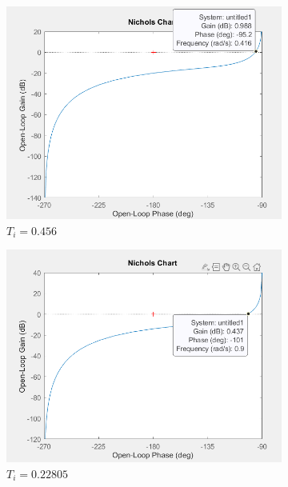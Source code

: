 \documentclass[12pt, a4paper]{report}
\begin{document}
\begin{figure}[H]
    \begin{subfigure}[h!]{0.4\linewidth}
        \includegraphics[width=\linewidth]{sim2ti1diag.png}
        \caption{$T_i = 0.456$}
    \end{subfigure}
    \hfill    
    \begin{subfigure}[h!]{0.4\linewidth}
        \includegraphics[width=\linewidth]{sim2ti2diag.png}
        \caption{$T_i = 0.22805$}
    \end{subfigure}    
    \hfill    
    \begin{subfigure}[h!]{0.4\linewidth}

\end{subfigure}
\end{figure}
\end{document}
